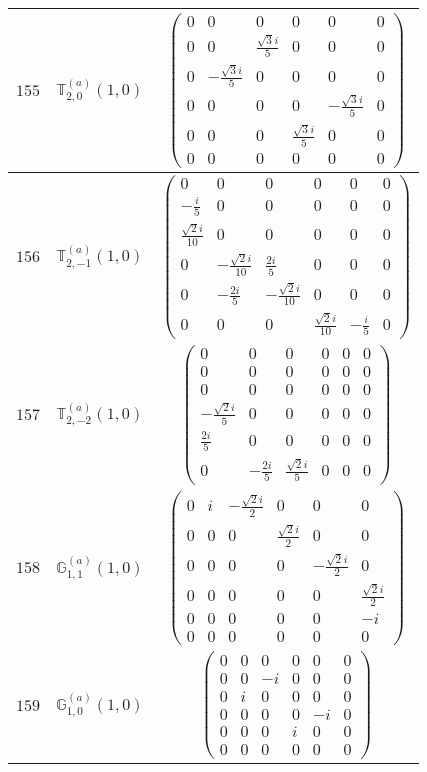 \documentclass[fleqn,8pt,landscape]{jsarticle}
\begin{document}
\begin{center}
\begin{longtable}{ccc}
$ 155 $ & $ \mathbb{T}_{2,0}^{(a)}(1,0) $ & $ \begin{pmatrix} 0 & 0 & 0 & 0 & 0 & 0 \\ 0 & 0 & \frac{\sqrt{3} i}{5} & 0 & 0 & 0 \\ 0 & - \frac{\sqrt{3} i}{5} & 0 & 0 & 0 & 0 \\ 0 & 0 & 0 & 0 & - \frac{\sqrt{3} i}{5} & 0 \\ 0 & 0 & 0 & \frac{\sqrt{3} i}{5} & 0 & 0 \\ 0 & 0 & 0 & 0 & 0 & 0 \end{pmatrix} $ \\ \hline
$ 156 $ & $ \mathbb{T}_{2,-1}^{(a)}(1,0) $ & $ \begin{pmatrix} 0 & 0 & 0 & 0 & 0 & 0 \\ - \frac{i}{5} & 0 & 0 & 0 & 0 & 0 \\ \frac{\sqrt{2} i}{10} & 0 & 0 & 0 & 0 & 0 \\ 0 & - \frac{\sqrt{2} i}{10} & \frac{2 i}{5} & 0 & 0 & 0 \\ 0 & - \frac{2 i}{5} & - \frac{\sqrt{2} i}{10} & 0 & 0 & 0 \\ 0 & 0 & 0 & \frac{\sqrt{2} i}{10} & - \frac{i}{5} & 0 \end{pmatrix} $ \\ \hline
$ 157 $ & $ \mathbb{T}_{2,-2}^{(a)}(1,0) $ & $ \begin{pmatrix} 0 & 0 & 0 & 0 & 0 & 0 \\ 0 & 0 & 0 & 0 & 0 & 0 \\ 0 & 0 & 0 & 0 & 0 & 0 \\ - \frac{\sqrt{2} i}{5} & 0 & 0 & 0 & 0 & 0 \\ \frac{2 i}{5} & 0 & 0 & 0 & 0 & 0 \\ 0 & - \frac{2 i}{5} & \frac{\sqrt{2} i}{5} & 0 & 0 & 0 \end{pmatrix} $ \\ \hline
$ 158 $ & $ \mathbb{G}_{1,1}^{(a)}(1,0) $ & $ \begin{pmatrix} 0 & i & - \frac{\sqrt{2} i}{2} & 0 & 0 & 0 \\ 0 & 0 & 0 & \frac{\sqrt{2} i}{2} & 0 & 0 \\ 0 & 0 & 0 & 0 & - \frac{\sqrt{2} i}{2} & 0 \\ 0 & 0 & 0 & 0 & 0 & \frac{\sqrt{2} i}{2} \\ 0 & 0 & 0 & 0 & 0 & - i \\ 0 & 0 & 0 & 0 & 0 & 0 \end{pmatrix} $ \\ \hline
$ 159 $ & $ \mathbb{G}_{1,0}^{(a)}(1,0) $ & $ \begin{pmatrix} 0 & 0 & 0 & 0 & 0 & 0 \\ 0 & 0 & - i & 0 & 0 & 0 \\ 0 & i & 0 & 0 & 0 & 0 \\ 0 & 0 & 0 & 0 & - i & 0 \\ 0 & 0 & 0 & i & 0 & 0 \\ 0 & 0 & 0 & 0 & 0 & 0 \end{pmatrix} $ \\ \hline

\end{longtable}
\end{center}
\end{document}
